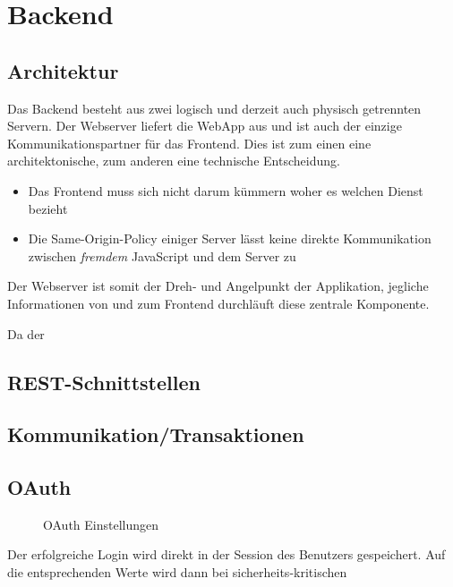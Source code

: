 \chapter{Backend}
\label{backend}

\section{Architektur}
Das Backend besteht aus zwei logisch und derzeit auch physisch getrennten Servern. 
Der Webserver liefert die \gls{WebApp} aus und ist auch der einzige Kommunikationspartner für das Frontend. Dies ist zum einen eine architektonische, zum anderen eine technische Entscheidung.

\begin{itemize}
\item Das Frontend muss sich nicht darum kümmern woher es welchen Dienst bezieht
\item Die Same-Origin-Policy\cite{sop} einiger Server lässt keine direkte Kommunikation zwischen \emph{fremdem} JavaScript und dem Server zu
\end{itemize}

Der Webserver ist somit der Dreh- und Angelpunkt der Applikation, jegliche Informationen von und zum Frontend durchläuft diese zentrale Komponente.

Da der 


\section{REST-Schnittstellen}




\section{Kommunikation/Transaktionen}

\section{OAuth}
\label{oauth}

\begin{figure}[H]
\caption{OAuth Einstellungen}
\end{figure}

Der erfolgreiche Login wird direkt in der Session des Benutzers gespeichert.
Auf die entsprechenden Werte wird dann bei sicherheits-kritischen